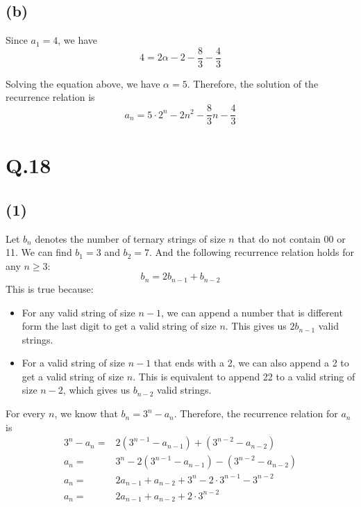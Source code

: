 \documentclass[a4paper,12pt]{article}
\begin{document}
\subsection*{(b)}

Since $a_1 = 4$, we have
\begin{equation*}
	4 = 2 \alpha - 2 - \frac{8}{3} - \frac{4}{3}
\end{equation*}

Solving the equation above, we have $\alpha = 5$.
Therefore, the solution of the recurrence relation is
\begin{equation*}
	a_n = 5 \cdot 2^n - 2n^2 - \frac{8}{3}n - \frac{4}{3}
\end{equation*}

\section*{Q.18}

\subsection*{(1)}

Let $b_n$ denotes the number of ternary strings of size $n$ that do not contain 00 or 11.
We can find $b_1 = 3$ and $b_2 = 7$.
And the following recurrence relation holds for any $n \geq 3$:
\begin{equation*}
	b_n = 2b_{n-1} + b_{n-2}
\end{equation*}
This is true because:
\begin{itemize}
	\item For any valid string of size $n-1$, we can append a number that is different form the last digit to get a valid string of size $n$.
		  This gives us $2b_{n-1}$ valid strings.
	\item For a valid string of size $n-1$ that ends with a 2, we can also append a 2 to get a valid string of size $n$.
		  This is equivalent to append 22 to a valid string of size $n-2$, which gives us $b_{n-2}$ valid strings.
\end{itemize}

For every $n$, we know that $b_n = 3^n - a_n$.
Therefore, the recurrence relation for $a_n$ is
\begin{align*}
	3^n - a_n =& 2(3^{n-1} - a_{n-1}) + (3^{n-2} - a_{n-2}) \\
	a_n =& 3^n -2(3^{n-1} - a_{n-1}) - (3^{n-2} - a_{n-2}) \\
	a_n =& 2a_{n-1} + a_{n-2} + 3^n - 2 \cdot 3^{n-1} - 3^{n-2} \\
	a_n =& 2a_{n-1} + a_{n-2} + 2 \cdot 3^{n-2}
\end{align*}
\end{document}

